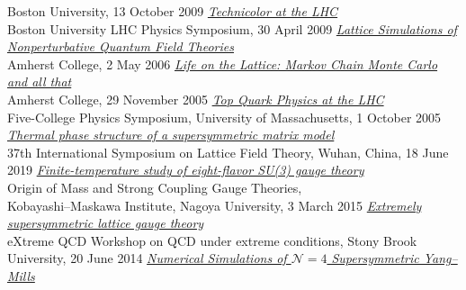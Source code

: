 \begin{spacelist}
\begin{revnumerate}
      Boston University, 13 October 2009
    \pagebreakitem
      \textit{\href{http://www.davidschaich.net/talks/TC_LHC.pdf}{Technicolor at the LHC}} \\
      Boston University LHC Physics Symposium, 30 April 2009
    \pagebreakitem
      \textit{\href{http://www.davidschaich.net/talks/thesisDefense.pdf}{Lattice Simulations of Nonperturbative Quantum Field Theories}} \\
      Amherst College, 2 May 2006
    \pagebreakitem
      \textit{\href{http://www.davidschaich.net/talks/thesisTalk.pdf}{Life on the Lattice: Markov Chain Monte Carlo and all that}} \\
      Amherst College, 29 November 2005
    \pagebreakitem
      \textit{\href{http://www.davidschaich.net/talks/topMass.pdf}{Top Quark Physics at the LHC}} \\
      Five-College Physics Symposium, University of Massachusetts, 1 October 2005 \\
%
%
%
\vspace{18 pt} \hspace{-22 pt}{\large \bfseries Posters} \vspace{-8 pt}
    \pagebreakitem
      \textit{\href{http://www.davidschaich.net/talks/1906Lattice-poster.pdf}{Thermal phase structure of a supersymmetric matrix model}} \\
      37th International Symposium on Lattice Field Theory, Wuhan, China, 18 June 2019
    \pagebreakitem
      \textit{\href{http://www.davidschaich.net/talks/SCGTposter.pdf}{Finite-temperature study of eight-flavor SU(3) gauge theory}} \\
      Origin of Mass and Strong Coupling Gauge Theories, \\ Kobayashi--Maskawa Institute, Nagoya University, 3 March 2015
    \pagebreakitem
      \textit{\href{http://www.davidschaich.net/talks/XQCD14.pdf}{Extremely supersymmetric lattice gauge theory}} \\
      eXtreme QCD Workshop on QCD under extreme conditions, Stony Brook University, 20 June 2014
    \pagebreakitem
      \textit{\href{http://www.davidschaich.net/talks/PPCM14.pdf}{Numerical Simulations of $\mathcal N = 4$ Supersymmetric Yang--Mills}} \\

\end{revnumerate}
\end{spacelist}
